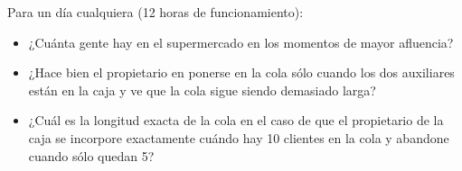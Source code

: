 \documentclass[
]{book}
\providecommand{\tightlist}{%
  \setlength{\itemsep}{0pt}\setlength{\parskip}{0pt}}
\theoremstyle{definition}
\theoremstyle{definition}
\theoremstyle{definition}
\theoremstyle{definition}
\theoremstyle{remark}
\begin{document}
Para un día cualquiera (12 horas de funcionamiento):

\begin{itemize}
\tightlist
\item
  ¿Cuánta gente hay en el supermercado en los momentos de mayor afluencia?
\item
  ¿Hace bien el propietario en ponerse en la cola sólo cuando los dos auxiliares están en la caja y ve que la cola sigue siendo demasiado larga?
\item
  ¿Cuál es la longitud exacta de la cola en el caso de que el propietario de la caja se incorpore exactamente cuándo hay 10 clientes en la cola y abandone cuando sólo quedan 5?
\end{itemize}

  
\end{document}

